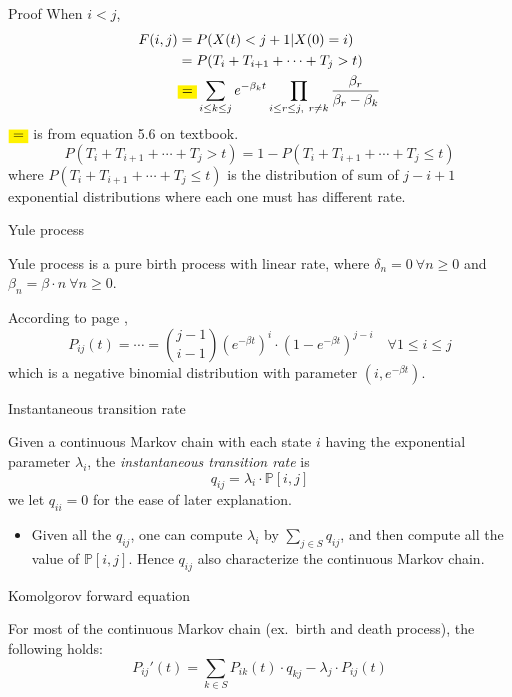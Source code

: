 \documentclass[mathserif]{beamer}
\begin{document}
\begin{frame}{Proof}
When $i < j$,
\begin{align*}
F(i,j) & = P(X(t) < j+1 | X(0) = i) \\
& = P(T_i + T_{i+1} + \cdots + T_j > t) \\
& \colorbox{yellow}{=} \sum_{i\leq k\leq j} e^{-\beta_k t} 
\prod_{i\leq r\leq j,~ r\neq k}\frac{\beta_r}{\beta_r - \beta_k}
\end{align*}
$\colorbox{yellow}{=}$ is from equation 5.6 on textbook.\\
\[
P(T_i + T_{i+1} + \cdots + T_j > t) = 1 - P(T_i + T_{i+1} + \cdots + T_j \leq t)
\]
where $P(T_i + T_{i+1} + \cdots + T_j \leq t)$ is the distribution of sum of $j-i+1$ exponential distributions where each one must has different rate.
\end{frame}

\begin{frame}{Yule process}
\begin{definition}
Yule process is a pure birth process with linear rate, 
where $\delta_n = 0~\forall n\geq 0$ and $\beta_n = \beta\cdot n~\forall n\geq 0$.
\end{definition}
According to page \pageref{pure_birth},
\[
P_{ij}(t) = \cdots = \binom{j-1}{i-1} (e^{-\beta t})^i \cdot (1 - e^{-\beta t})^{j-i} \quad\forall 1\leq i\leq j
\]
which is a negative binomial distribution with parameter $(i, e^{-\beta t})$.
\end{frame}

\begin{frame}{Instantaneous transition rate}
\begin{definition}
Given a continuous Markov chain with each state $i$ having the exponential parameter $\lambda_i$,
the \emph{instantaneous transition rate} is
\[
q_{ij} = \lambda_i\cdot \mathbb{P}[i,j]
\]
we let $q_{ii} = 0$ for the ease of later explanation.
\end{definition}
\begin{itemize}
\item Given all the $q_{ij}$, one can compute $\lambda_i$ by $\sum_{j\in S} q_{ij}$, and then compute all the value of $\mathbb{P}[i,j]$.
Hence $q_{ij}$ also characterize the continuous Markov chain.
\end{itemize}
\end{frame}

\begin{frame}{Komolgorov forward equation}
\begin{theorem}
For most of the continuous Markov chain (ex.\ birth and death process), the following holds:
\[
{P_{ij}}'(t) = \sum_{k\in S} P_{ik}(t)\cdot q_{kj} - \lambda_j\cdot P_{ij}(t)
\]
\end{theorem}
\end{frame}
\end{document}
